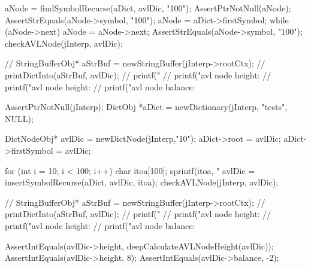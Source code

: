   aNode = findSymbolRecurse(aDict, avlDic, "100");
  AssertPtrNotNull(aNode);
  AssertStrEquals(aNode->symbol, "100");
  aNode = aDict->firstSymbol;
  while (aNode->next) aNode = aNode->next;
  AssertStrEquals(aNode->symbol, "100");
  checkAVLNode(jInterp, avlDic);
  
//  StringBufferObj* aStrBuf = newStringBuffer(jInterp->rootCtx);
//  printDictInto(aStrBuf, avlDic);
//  printf("%
//  printf("avl node height: %
//  printf("avl node height: %
//  printf("avl node balance: %
\stopCTest
\stopTestCase

\startCTest
  AssertPtrNotNull(jInterp);
  DictObj *aDict = newDictionary(jInterp, "tests", NULL);

  DictNodeObj* avlDic = newDictNode(jInterp,"10");
  aDict->root         = avlDic;
  aDict->firstSymbol  = avlDic;

  for (int i = 10; i < 100; i++) {
    char itoa[100];
    sprintf(itoa, "%
    avlDic = insertSymbolRecurse(aDict, avlDic, itoa);
  }
  checkAVLNode(jInterp, avlDic);

//  StringBufferObj* aStrBuf = newStringBuffer(jInterp->rootCtx);
//  printDictInto(aStrBuf, avlDic);
//  printf("%
//  printf("avl node height: %
//  printf("avl node height: %
//  printf("avl node balance: %

  AssertIntEquals(avlDic->height, deepCalculateAVLNodeHeight(avlDic));
  AssertIntEquals(avlDic->height, 8);
  AssertIntEquals(avlDic->balance, -2);
\stopCTest
\stopTestCase
\stopTestSuite